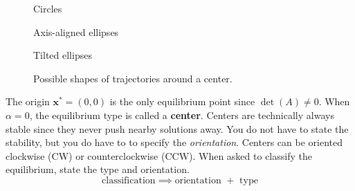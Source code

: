 \documentclass[11pt,letterpaper]{article}
\begin{document}
\begin{figure}[H]
\centering
\begin{minipage}[t]{0.31\linewidth}
\centering
{}

\small Circles
\end{minipage}
\hfill
\begin{minipage}[t]{0.31\linewidth}
\centering
{}

\small Axis-aligned ellipses
\end{minipage}
\hfill
\begin{minipage}[t]{0.31\linewidth}
\centering
{}

\small Tilted ellipses
\end{minipage}
\caption{Possible shapes of trajectories around a center.}
\end{figure}

The origin $\textbf{x}^*=(0,0)$ is the only equilibrium point since $\det(A)\ne0$. When $\alpha=0$, the equilibrium type is called a \textbf{center}. Centers are technically always stable since they never push nearby solutions away. You do not have to state the stability, but you do have to to specify the \textit{orientation}. Centers can be oriented clockwise (CW) or counterclockwise (CCW). When asked to classify the equilibrium, state the type and orientation.
$$
\boxed{\text{classification} \implies\text{orientation }+\text{ type}}
$$
\end{document}
